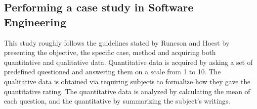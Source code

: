 \subsection{Performing a case study in Software Engineering}
This study roughly follows the guidelines stated by Runeson and Hoest \cite{CaseStudyGuidelines} by presenting the objective, the specific case, method and acquiring both quantitative and qualitative data. Quantitative data is acquired by asking a set of predefined questioned and answering them on a scale from 1 to 10. The qualitative data is obtained via requiring subjects to formalize how they gave the quantitative rating.
The quantitative data is analyzed by calculating the mean of each question, and the quantitative by summarizing the subject's writings.
